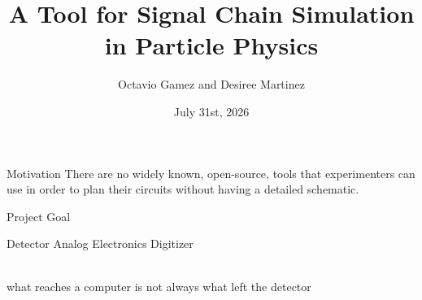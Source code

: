 \documentclass[aspectratio=169, 10pt] {beamer}
\title{A Tool for Signal Chain Simulation in Particle Physics}
\subtitle{Octavio Gamez and Desiree Martinez}
\author{July 31st, 2026}
\begin{document}
\frame[c]{\maketitle}

    \begin{frame}{Motivation}
    \large
    There are no widely known, open-source, tools that experimenters can use in order to plan their circuits without having a detailed schematic. \\

    \end{frame}






    





    \begin{frame}{Project Goal}
        
        \centering
        {\Large Detector \to Analog \hspace{.4em} Electronics \to Digitizer \par} \\

        \vspace{1.5 cm}
         what reaches a computer is not always what left the detector 
    \end{frame}
\end{document}
